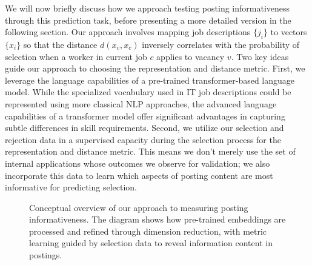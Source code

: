 We will now briefly discuss how we approach testing posting informativeness through this prediction task, before presenting a more detailed version in the following section. Our approach involves mapping job descriptions \(\{j_i\}\) to vectors \(\{x_i\}\) so that the distance \(d(x_v, x_c)\) inversely correlates with the probability of selection when a worker in current job \(c\) applies to vacancy \(v\). Two key ideas guide our approach to choosing the representation and distance metric. First, we leverage the language capabilities of a pre-trained transformer-based language model. While the specialized vocabulary used in IT job descriptions could be represented using more classical NLP approaches, the advanced language capabilities of a transformer model offer significant advantages in capturing subtle differences in skill requirements. Second, we utilize our selection and rejection data in a supervised capacity during the selection process for the representation and distance metric. This means we don't merely use the set of internal applications whose outcomes we observe for validation; we also incorporate this data to learn which aspects of posting content are most informative for predicting selection.


\begin{figure}
    \centering
    \caption{Conceptual overview of our approach to measuring posting informativeness. The diagram shows how pre-trained embeddings are processed and refined through dimension reduction, with metric learning guided by selection data to reveal information content in postings.}
    \label{fig:conceptual_overview}
\end{figure}


